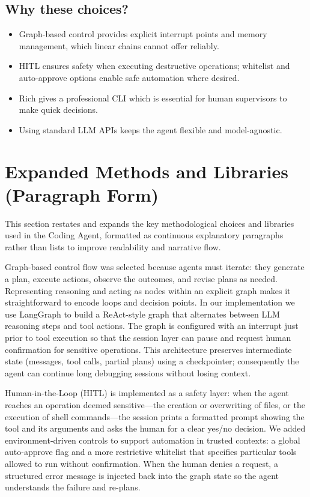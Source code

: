 \documentclass[12pt, a4paper]{article}
\begin{document}
\subsection{Why these choices?}
\begin{itemize}
  \item Graph-based control provides explicit interrupt points and memory management, which linear chains cannot offer reliably.
  \item HITL ensures safety when executing destructive operations; whitelist and auto-approve options enable safe automation where desired.
  \item Rich gives a professional CLI which is essential for human supervisors to make quick decisions.
  \item Using standard LLM APIs keeps the agent flexible and model-agnostic.
\end{itemize}

\bigskip

\section{Expanded Methods and Libraries (Paragraph Form)}
This section restates and expands the key methodological choices and libraries used in the Coding Agent, formatted as continuous explanatory paragraphs rather than lists to improve readability and narrative flow.

Graph-based control flow was selected because agents must iterate: they generate a plan, execute actions, observe the outcomes, and revise plans as needed. Representing reasoning and acting as nodes within an explicit graph makes it straightforward to encode loops and decision points. In our implementation we use LangGraph to build a ReAct-style graph that alternates between LLM reasoning steps and tool actions. The graph is configured with an interrupt just prior to tool execution so that the session layer can pause and request human confirmation for sensitive operations. This architecture preserves intermediate state (messages, tool calls, partial plans) using a checkpointer; consequently the agent can continue long debugging sessions without losing context.

Human-in-the-Loop (HITL) is implemented as a safety layer: when the agent reaches an operation deemed sensitive—the creation or overwriting of files, or the execution of shell commands—the session prints a formatted prompt showing the tool and its arguments and asks the human for a clear yes/no decision. We added environment-driven controls to support automation in trusted contexts: a global auto-approve flag and a more restrictive whitelist that specifies particular tools allowed to run without confirmation. When the human denies a request, a structured error message is injected back into the graph state so the agent understands the failure and re-plans.
\end{document}
